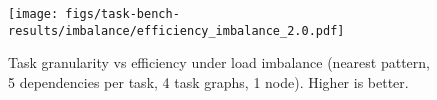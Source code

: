 \begin{figure}[t]

\centering
\texttt{[image: figs/task-bench-results/imbalance/efficiency\_imbalance\_2.0.pdf]}

\vspace{-0.15cm}
\caption{Task granularity vs efficiency under load imbalance (nearest pattern, 5 dependencies per task, 4 task graphs, 1 node). Higher is better.\label{fig:efficiency-imbalance}}
\vspace{-0.1cm}
\end{figure}
